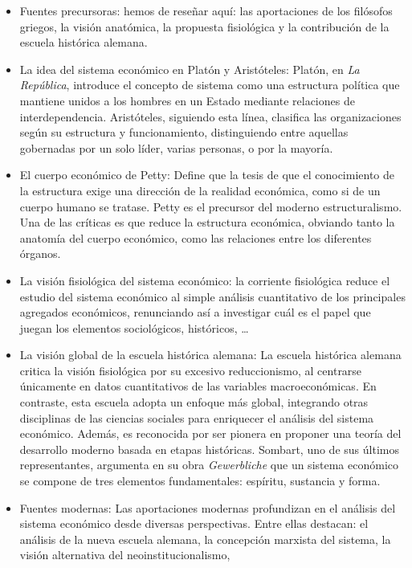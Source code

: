 \documentclass[12pt]{book} %
\begin{document}
\begin{itemize}
\item
  Fuentes precursoras: hemos de reseñar aquí: las aportaciones de los
  filósofos griegos, la visión anatómica, la propuesta fisiológica y la
  contribución de la escuela histórica alemana.
\item
  La idea del sistema económico en Platón y Aristóteles: Platón, en
  \emph{La República}, introduce el concepto de sistema como una
  estructura política que mantiene unidos a los hombres en un Estado
  mediante relaciones de interdependencia. Aristóteles, siguiendo esta
  línea, clasifica las organizaciones según su estructura y
  funcionamiento, distinguiendo entre aquellas gobernadas por un solo
  líder, varias personas, o por la mayoría.
\item
  El cuerpo económico de Petty: Define que la tesis de que el
  conocimiento de la estructura exige una dirección de la realidad
  económica, como si de un cuerpo humano se tratase. Petty es el
  precursor del moderno estructuralismo. Una de las críticas es que
  reduce la estructura económica, obviando tanto la anatomía del cuerpo
  económico, como las relaciones entre los diferentes órganos.
\item
  La visión fisiológica del sistema económico: la corriente fisiológica
  reduce el estudio del sistema económico al simple análisis
  cuantitativo de los principales agregados económicos, renunciando así
  a investigar cuál es el papel que juegan los elementos sociológicos,
  históricos, \ldots{}
\item
  La visión global de la escuela histórica alemana: La escuela histórica
  alemana critica la visión fisiológica por su excesivo reduccionismo,
  al centrarse únicamente en datos cuantitativos de las variables
  macroeconómicas. En contraste, esta escuela adopta un enfoque más
  global, integrando otras disciplinas de las ciencias sociales para
  enriquecer el análisis del sistema económico. Además, es reconocida
  por ser pionera en proponer una teoría del desarrollo moderno basada
  en etapas históricas. Sombart, uno de sus últimos representantes,
  argumenta en su obra \emph{Gewerbliche} que un sistema económico se
  compone de tres elementos fundamentales: espíritu, sustancia y forma.
\item
  Fuentes modernas: Las aportaciones modernas profundizan en el análisis
  del sistema económico desde diversas perspectivas. Entre ellas
  destacan: el análisis de la nueva escuela alemana, la concepción
  marxista del sistema, la visión alternativa del neoinstitucionalismo,

\end{itemize}
\end{document}
